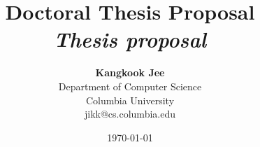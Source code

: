 \documentclass[12pt]{article}
\title{{\bf Doctoral Thesis Proposal} \\
\it Thesis proposal}
\author{ {\bf Kangkook Jee}  \\
Department of Computer Science \\
Columbia University\\
{\small jikk@cs.columbia.edu}
}
\date{\today}
\begin{document}
\pagestyle{plain}
\maketitle

\pagebreak


\pagebreak
\tableofcontents
\pagebreak




\cleardoublepage
{}

\pagebreak

\begin{footnotesize}


\end{footnotesize}
\end{document}
